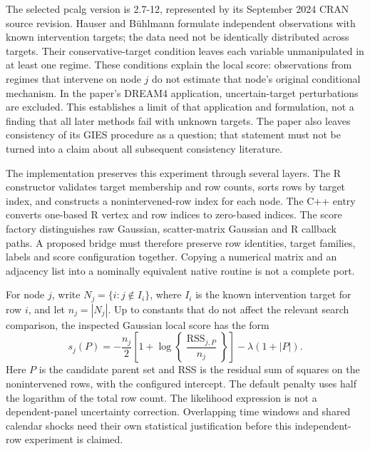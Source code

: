 The selected pcalg version is 2.7-12, represented by its September 2024 CRAN
source revision. Hauser and B\"uhlmann formulate independent observations with
known intervention targets; the data need not be identically distributed
across targets. Their conservative-target condition leaves each variable
unmanipulated in at least one regime. These conditions explain the local
score: observations from regimes that intervene on node $j$ do not estimate
that node's original conditional mechanism. In the paper's DREAM4 application,
uncertain-target perturbations are excluded. This establishes a limit of that
application and formulation, not a finding that all later methods fail with
unknown targets. The paper also leaves consistency of its GIES procedure as a
question; that statement must not be turned into a claim about all subsequent
consistency literature. \citep{exec14_pt_paper_gies}

The implementation preserves this experiment through several layers. The R
constructor validates target membership and row counts, sorts rows by target
index, and constructs a nonintervened-row index for each node. The C++ entry
converts one-based R vertex and row indices to zero-based indices. The score
factory distinguishes raw Gaussian, scatter-matrix Gaussian and R callback
paths. A proposed bridge must therefore preserve row identities, target
families, labels and score configuration together. Copying a numerical matrix
and an adjacency list into a nominally equivalent native routine is not a
complete port. \citep{exec16_ct_pcalg}

For node $j$, write $N_j=\{i:j\notin I_i\}$, where $I_i$ is the known
intervention target for row $i$, and let $n_j=|N_j|$. Up to constants that do
not affect the relevant search comparison, the inspected Gaussian local score
has the form
\[
 s_j(P)=-\frac{n_j}{2}\left[1+\log\left\{
       \frac{\operatorname{RSS}_{j,P}}{n_j}\right\}\right]
       -\lambda(1+|P|).
\]
Here $P$ is the candidate parent set and RSS is the residual sum of squares
on the nonintervened rows, with the configured intercept. The default penalty
uses half the logarithm of the total row count. The likelihood expression is
not a dependent-panel uncertainty correction. Overlapping time windows and
shared calendar shocks need their own statistical justification before this
independent-row experiment is claimed.

